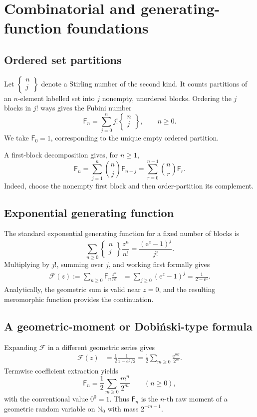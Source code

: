 \documentclass[11pt,oneside]{article}
\numberwithin{equation}{section}
\newcommand{\e}{\mathrm e}
\newcommand{\N}{\mathbb N}
\newcommand{\Fub}{\mathsf F}
\newcommand{\StirlingTwo}[2]{\left\{\!\begin{matrix}#1\\#2\end{matrix}\!\right\}}
\begin{document}
\section{Combinatorial and generating-function foundations}
\label{sec:combinatorial}

\subsection{Ordered set partitions}

Let \(\StirlingTwo{n}{j}\) denote a Stirling number of the second kind.  It counts partitions of an \(n\)-element labelled set into \(j\) nonempty, unordered blocks.  Ordering the \(j\) blocks in \(j!\) ways gives the Fubini number
\begin{equation}
 \Fub_n=\sum_{j=0}^{n}j!\StirlingTwo{n}{j},
 \qquad n\ge0.
 \label{eq:fubini-stirling}
\end{equation}
We take \(\Fub_0=1\), corresponding to the unique empty ordered partition.

A first-block decomposition gives, for \(n\ge1\),
\begin{equation}
 \Fub_n=\sum_{j=1}^{n}\binom{n}{j}\Fub_{n-j}
       =\sum_{r=0}^{n-1}\binom{n}{r}\Fub_r.
 \label{eq:fubini-recurrence}
\end{equation}
Indeed, choose the nonempty first block and then order-partition its complement.

\subsection{Exponential generating function}

The standard exponential generating function for a fixed number of blocks is
\[
 \sum_{n\ge0}\StirlingTwo{n}{j}\frac{z^n}{n!}
 =\frac{(\e^z-1)^j}{j!}.
\]
Multiplying by \(j!\), summing over \(j\), and working first formally gives
\begin{align}
 \mathcal F(z)
 :=\sum_{n\ge0}\Fub_n\frac{z^n}{n!}
 &=\sum_{j\ge0}(\e^z-1)^j
 =\frac{1}{2-\e^z}.
 \label{eq:fubini-egf}
\end{align}
Analytically, the geometric sum is valid near \(z=0\), and the resulting meromorphic function provides the continuation.

\subsection{A geometric-moment or Dobiński-type formula}

Expanding \(\mathcal F\) in a different geometric series gives
\begin{align}
 \mathcal F(z)
 &=\frac12\frac{1}{1-\e^z/2}
 =\frac12\sum_{m\ge0}\frac{\e^{mz}}{2^m}.
 \label{eq:geometric-egf-expansion}
\end{align}
Termwise coefficient extraction yields
\begin{equation}
 \boxed{\displaystyle
 \Fub_n=\frac12\sum_{m\ge0}\frac{m^n}{2^m}}
 \qquad(n\ge0),
 \label{eq:fubini-dobinski}
\end{equation}
with the conventional value \(0^0=1\).  Thus \(\Fub_n\) is the \(n\)-th raw moment of a geometric random variable on \(\N_0\) with mass \(2^{-m-1}\).
\end{document}
